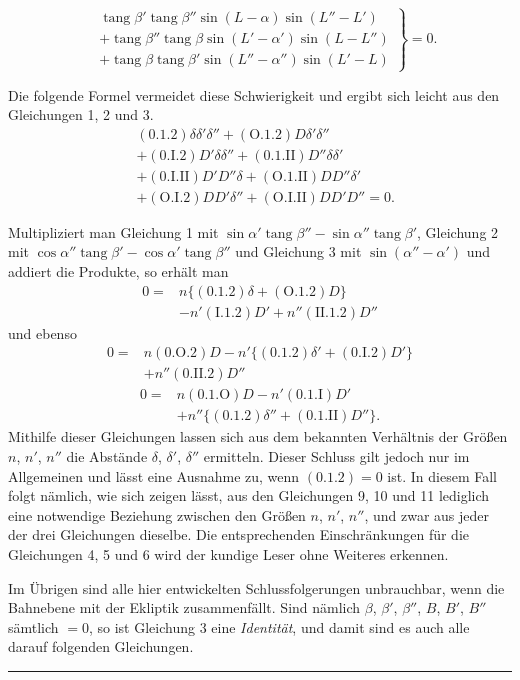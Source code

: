 \[
\left.\begin{aligned}
&\operatorname{tang}\beta'\operatorname{tang}\beta''\sin(L-\alpha)\sin(L''-L')\\
&+\operatorname{tang}\beta''\operatorname{tang}\beta\sin(L'-\alpha')\sin(L-L'')\\
&+\operatorname{tang}\beta\operatorname{tang}\beta'\sin(L''-\alpha'')\sin(L'-L)
\end{aligned}\right\}=0.
\]
\par
Die folgende Formel vermeidet diese Schwierigkeit und ergibt sich leicht aus den Gleichungen 1, 2 und 3.
\[
\begin{aligned}
&(0.1.2)\delta\delta'\delta''+(\mathrm{O}.1.2)D\delta'\delta''\\
&+(0.\mathrm{I}.2)D'\delta\delta''+(0.1.\mathrm{II})D''\delta\delta'\\
&+(0.\mathrm{I}.\mathrm{II})D'D''\delta+(\mathrm{O}.1.\mathrm{II})DD''\delta'\\
&+(\mathrm{O}.\mathrm{I}.2)DD'\delta''+(\mathrm{O}.\mathrm{I}.\mathrm{II})DD'D''=0.
\end{aligned}\tag*{8)}
\]
\par
Multipliziert man Gleichung 1 mit $\sin\alpha'\operatorname{tang}\beta''-\sin\alpha''\operatorname{tang}\beta'$, Gleichung 2 mit $\cos\alpha''\operatorname{tang}\beta'-\cos\alpha'\operatorname{tang}\beta''$ und Gleichung 3 mit $\sin(\alpha''-\alpha')$ und addiert die Produkte, so erhält man
\[
\begin{aligned}
0={}&n\{(0.1.2)\delta+(\mathrm{O}.1.2)D\}\\
&-n'(\mathrm{I}.1.2)D'+n''(\mathrm{II}.1.2)D''
\end{aligned}\tag*{9)}
\]
und ebenso
\[
\begin{aligned}
0={}&n(0.\mathrm{O}.2)D-n'\{(0.1.2)\delta'+(0.\mathrm{I}.2)D'\}\\
&+n''(0.\mathrm{II}.2)D''
\end{aligned}\tag*{10)}
\]
\[
\begin{aligned}
0={}&n(0.1.\mathrm{O})D-n'(0.1.\mathrm{I})D'\\
&+n''\{(0.1.2)\delta''+(0.1.\mathrm{II})D''\}.
\end{aligned}\tag*{11)}
\]
Mithilfe dieser Gleichungen lassen sich aus dem bekannten Verhältnis der Größen $n$, $n'$, $n''$ die Abstände $\delta$, $\delta'$, $\delta''$ ermitteln. Dieser Schluss gilt jedoch nur im Allgemeinen und lässt eine Ausnahme zu, wenn $(0.1.2)=0$ ist. In diesem Fall folgt nämlich, wie sich zeigen lässt, aus den Gleichungen 9, 10 und 11 lediglich eine notwendige Beziehung zwischen den Größen $n$, $n'$, $n''$, und zwar aus jeder der drei Gleichungen dieselbe. Die entsprechenden Einschränkungen für die Gleichungen 4, 5 und 6 wird der kundige Leser ohne Weiteres erkennen.
\par
Im Übrigen sind alle hier entwickelten Schlussfolgerungen unbrauchbar, wenn die Bahnebene mit der Ekliptik zusammenfällt. Sind nämlich $\beta$, $\beta'$, $\beta''$, $B$, $B'$, $B''$ sämtlich $=0$, so ist Gleichung 3 eine \emph{Identität}, und damit sind es auch alle darauf folgenden Gleichungen.
\par\bigskip\begin{center}\rule{.23\linewidth}{.35pt}\end{center}
